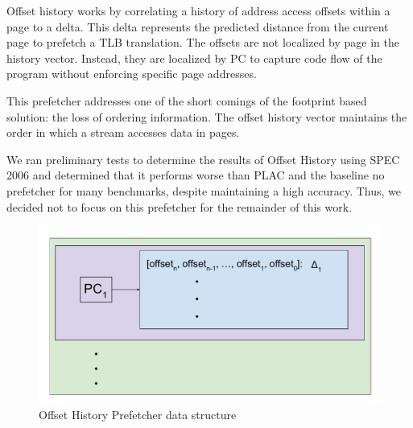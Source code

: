 \documentclass[conference]{IEEEtran}
\begin{document}
        Offset history works by correlating a history of address access offsets within a page to a delta. This delta represents the predicted distance from the current page to prefetch a TLB translation. The offsets are not localized by page in the history vector. Instead, they are localized by PC to capture code flow of the program without enforcing specific page addresses. 

        This prefetcher addresses one of the short comings of the footprint based solution: the loss of ordering information. The offset history vector maintains the order in which a stream accesses data in pages. 

        We ran preliminary tests to determine the results of Offset History using SPEC 2006 and determined that it performs worse than PLAC and the baseline no prefetcher for many benchmarks, despite maintaining a high accuracy. Thus, we decided not to focus on this prefetcher for the remainder of this work. 

        \begin{figure}[h]
            \centering
                \includegraphics[width=.5\textwidth]{offset_history.pdf}
            \caption{Offset History Prefetcher data structure}
            \label{fig:offset}
        \end{figure}
\end{document}
